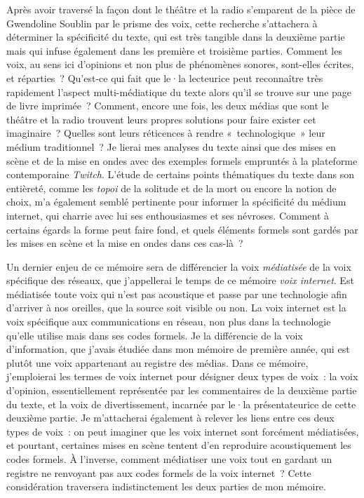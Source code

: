\documentclass[
]{article}
\begin{document}
Après avoir traversé la façon dont le théâtre et la radio s'emparent de la pièce de Gwendoline Soublin par le prisme des voix, cette recherche s'attachera à déterminer la spécificité du texte, qui est très tangible dans la deuxième partie mais qui infuse également dans les première et troisième parties. Comment les voix, au sens ici d'opinions et non plus de phénomènes sonores, sont-elles écrites, et réparties~? Qu'est-ce qui fait que le·la lecteurice peut reconnaître très rapidement l'aspect multi-médiatique du texte alors qu'il se trouve sur une page de livre imprimée~? Comment, encore une fois, les deux médias que sont le théâtre et la radio trouvent leurs propres solutions pour faire exister cet imaginaire~? Quelles sont leurs réticences à rendre «~technologique~» leur médium traditionnel~? Je lierai mes analyses du texte ainsi que des mises en scène et de la mise en ondes avec des exemples formels empruntés à la plateforme contemporaine \emph{Twitch}. L'étude de certains points thématiques du texte dans son entièreté, comme les \emph{topoi} de la solitude et de la mort ou encore la notion de choix, m'a également semblé pertinente pour informer la spécificité du médium internet, qui charrie avec lui ses enthousiasmes et ses névroses. Comment à certains égards la forme peut faire fond, et quels éléments formels sont gardés par les mises en scène et la mise en ondes dans ces cas-là~?

Un dernier enjeu de ce mémoire sera de différencier la voix \emph{médiatisée} de la voix spécifique des réseaux, que j'appellerai le temps de ce mémoire \emph{voix internet}. Est médiatisée toute voix qui n'est pas acoustique et passe par une technologie afin d'arriver à nos oreilles, que la source soit visible ou non. La voix internet est la voix spécifique aux communications en réseau, non plus dans la technologie qu'elle utilise mais dans ses codes formels. Je la différencie de la voix d'information, que j'avais étudiée dans mon mémoire de première année, qui est plutôt une voix appartenant au registre des médias. Dans ce mémoire, j'emploierai les termes de voix internet pour désigner deux types de voix~: la voix d'opinion, essentiellement représentée par les commentaires de la deuxième partie du texte, et la voix de divertissement, incarnée par le·la présentateurice de cette deuxième partie. Je m'attacherai également à relever les liens entre ces deux types de voix~: on peut imaginer que les voix internet sont forcément médiatisées, et pourtant, certaines mises en scène tentent d'en reproduire acoustiquement les codes formels. À l'inverse, comment médiatiser une voix tout en gardant un registre ne renvoyant pas aux codes formels de la voix internet~? Cette considération traversera indistinctement les deux parties de mon mémoire.
\end{document}
